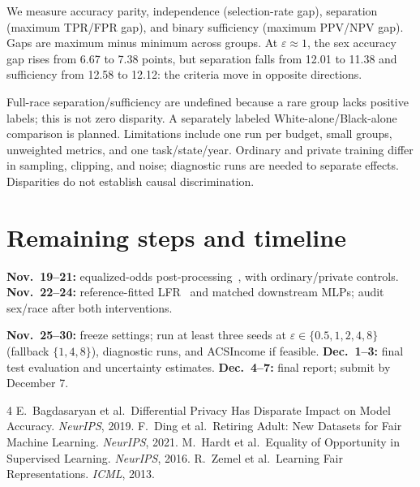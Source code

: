 \documentclass[11pt,letterpaper]{article}
\newcommand{\eps}{\varepsilon}
\begin{document}
We measure accuracy parity, independence (selection-rate gap), separation (maximum TPR/FPR gap), and binary sufficiency (maximum PPV/NPV gap). Gaps are maximum minus minimum across groups. At $\eps\approx1$, the sex accuracy gap rises from 6.67 to 7.38 points, but separation falls from 12.01 to 11.38 and sufficiency from 12.58 to 12.12: the criteria move in opposite directions.

Full-race separation/sufficiency are undefined because a rare group lacks positive labels; this is not zero disparity. A separately labeled White-alone/Black-alone comparison is planned. Limitations include one run per budget, small groups, unweighted metrics, and one task/state/year. Ordinary and private training differ in sampling, clipping, and noise; diagnostic runs are needed to separate effects. Disparities do not establish causal discrimination.

\section{Remaining steps and timeline}
\textbf{Nov.\ 19--21:} equalized-odds post-processing~\cite{hardt2016}, with ordinary/private controls. \textbf{Nov.\ 22--24:} reference-fitted LFR~\cite{zemel2013} and matched downstream MLPs; audit sex/race after both interventions.

\textbf{Nov.\ 25--30:} freeze settings; run at least three seeds at $\eps\in\{0.5,1,2,4,8\}$ (fallback $\{1,4,8\}$), diagnostic runs, and ACSIncome if feasible. \textbf{Dec.\ 1--3:} final test evaluation and uncertainty estimates. \textbf{Dec.\ 4--7:} final report; submit by December 7.

\renewcommand{\refname}{References}
\begin{thebibliography}{4}
\setlength{\itemsep}{0pt}\setlength{\parskip}{0pt}
 E.\ Bagdasaryan et al.\ Differential Privacy Has Disparate Impact on Model Accuracy. \textit{NeurIPS}, 2019.
 F.\ Ding et al.\ Retiring Adult: New Datasets for Fair Machine Learning. \textit{NeurIPS}, 2021.
 M.\ Hardt et al.\ Equality of Opportunity in Supervised Learning. \textit{NeurIPS}, 2016.
 R.\ Zemel et al.\ Learning Fair Representations. \textit{ICML}, 2013.
\end{thebibliography}
\end{document}
